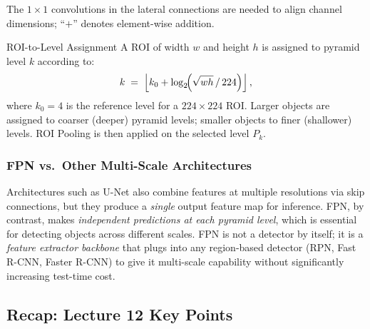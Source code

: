 \documentclass[11pt,a4paper]{article}
\begin{document}
The $1 \times 1$ convolutions in the lateral connections are needed to align channel dimensions; ``$+$'' denotes element-wise addition.

\begin{defbox}{ROI-to-Level Assignment}
A ROI of width $w$ and height $h$ is assigned to pyramid level $k$ according to:
\[
  k \;=\; \left\lfloor k_0 + \log_2\!\Bigl(\sqrt{wh}\,/\,224\Bigr) \right\rfloor,
\]
where $k_0 = 4$ is the reference level for a $224 \times 224$ ROI. Larger objects are assigned to coarser (deeper) pyramid levels; smaller objects to finer (shallower) levels. ROI Pooling is then applied on the selected level $P_k$.
\end{defbox}

\subsubsection{FPN vs.\ Other Multi-Scale Architectures}

Architectures such as U-Net also combine features at multiple resolutions via skip connections, but they produce a \emph{single} output feature map for inference. FPN, by contrast, makes \emph{independent predictions at each pyramid level}, which is essential for detecting objects across different scales. FPN is not a detector by itself; it is a \emph{feature extractor backbone} that plugs into any region-based detector (RPN, Fast R-CNN, Faster R-CNN) to give it multi-scale capability without significantly increasing test-time cost.

\subsection{Recap: Lecture 12 Key Points}
\label{sec:recap_detection}
\end{document}
